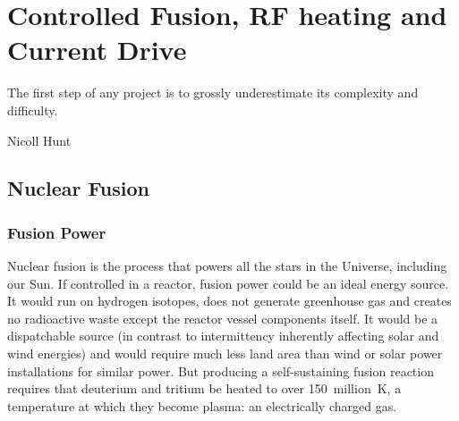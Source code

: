 \setchapterpreamble[u]{\margintoc}
\chapter{Controlled Fusion, RF heating and Current Drive}
\label{chap:fusion_and_rf}

\epigraph{The first step of any project is to grossly underestimate its complexity and difficulty. }{Nicoll Hunt}


\section{Nuclear Fusion}\label{sec:nuclear_fusion}
\subsection{Fusion Power}\label{sec:fusion_power}
Nuclear fusion is the process that powers all the stars in the Universe, including our Sun. If controlled in a reactor, fusion power could be an ideal energy source. It would run on hydrogen isotopes, does not generate greenhouse gas and creates no radioactive waste except the reactor vessel components itself. It would be a dispatchable source (in contrast to intermittency inherently affecting solar and wind energies) and would require much less land area than wind or solar power installations for similar power. But producing a self-sustaining fusion reaction requires that deuterium and tritium be heated to over 150~million~\si{K}, a temperature at which they become plasma: an electrically charged gas. 

